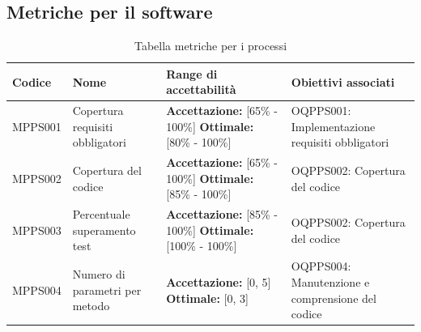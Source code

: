 \documentclass[openany,12pt,a4paper]{report}
\begin{document}
	
	\subsection{Metriche per il software}
	
	\begin{longtable}{| p{2cm} | p{3.5cm} |p{5.5cm} | p{5.5cm} |}
		\caption {Tabella metriche per i processi} \label{tab:metriche} \\
		\hline
		\textbf{Codice} & \textbf{Nome} & \textbf{Range di accettabilità} & \textbf{Obiettivi associati}\\
		\hline
		\endhead
		
		\newline MPPS001 &
		\newline Copertura requisiti obbligatori &
		\newline \textbf{Accettazione:} [65\% - 100\%]
		\newline \textbf{Ottimale:} [80\% - 100\%] &
		\newline OQPPS001: Implementazione requisiti obbligatori
		\\[1em]
		
		\hline
		
		\newline MPPS002 &
		\newline Copertura del codice &
		\newline \textbf{Accettazione:} [65\% - 100\%]
		\newline \textbf{Ottimale:} [85\% - 100\%] &
		\newline OQPPS002: Copertura del codice
		\\[1em]
		
		\hline
		
		\newline MPPS003 &
		\newline Percentuale superamento test &
		\newline \textbf{Accettazione:} [85\% - 100\%] 
		\newline \textbf{Ottimale:} [100\% - 100\%] &
		\newline OQPPS002: Copertura del codice
		\\[1em]
		
		\hline
		
		\newline MPPS004 &
		\newline Numero di parametri per metodo &
		\newline \textbf{Accettazione:} [0, 5]
		\newline \textbf{Ottimale:} [0, 3] &
		\newline OQPPS004: Manutenzione e comprensione del codice
		\\[1em]
		

\end{longtable}
\end{document}
